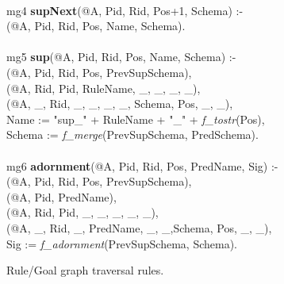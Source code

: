 \begin{figure}
\begin{boxedminipage}{\linewidth}
\\
mg4 {\bf supNext}(@A, Pid, Rid, Pos+1, Schema) :- \\
(@A, Pid, Rid, Pos, Name, Schema). \\
\\
mg5 {\bf sup}(@A, Pid, Rid, Pos, Name, Schema) :- \\
(@A, Pid, Rid, Pos, PrevSupSchema),\\
(@A, Rid, Pid, RuleName, \_, \_, \_, \_),\\
(@A, \_, Rid, \_, \_, \_, \_, Schema, Pos, \_, \_),\\
\datalogspace Name := "sup\_" + RuleName + "\_" + {\em f\_tostr}(Pos),\\
\datalogspace Schema := {\em f\_merge}(PrevSupSchema, PredSchema).\\
\\
mg6 {\bf adornment}(@A, Pid, Rid, Pos, PredName, Sig) :- \\
(@A, Pid, Rid, Pos, PrevSupSchema),\\
(@A, Pid, PredName), \\
(@A, Rid, Pid, \_, \_, \_, \_, \_),\\
(@A, \_, Rid, \_, PredName, \_, \_,Schema, Pos, \_, \_),\\ 
\datalogspace Sig := {\em f\_adornment}(PrevSupSchema, Schema).
\end{boxedminipage}
\caption{\label{ch:evita:fig:magicRules}Rule/Goal graph traversal rules.}
\end{figure}


